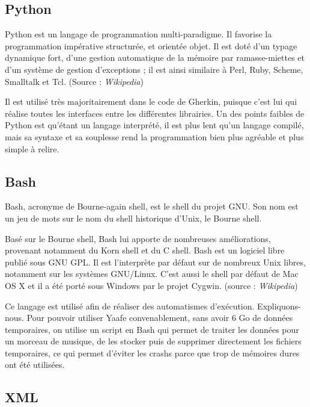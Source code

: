 \documentclass{report}
\begin{document}
\subsection{Python}

Python est un langage de programmation multi-paradigme. Il favorise la programmation impérative structurée, et orientée objet. Il est doté d'un typage dynamique fort, d'une gestion automatique de la mémoire par ramasse-miettes et d'un système de gestion d'exceptions ; il est ainsi similaire à Perl, Ruby, Scheme, Smalltalk et Tcl. (Source : \emph{Wikipedia})


Il est utilisé très majoritairement dans le code de Gherkin, puisque c'est lui qui réalise toutes les interfaces entre les différentes librairies. Un des points faibles de Python est qu'étant un langage interprété, il est plus lent qu'un langage compilé, mais sa syntaxe et sa souplesse rend la programmation bien plus agréable et plus simple à relire.


\subsection{Bash}
Bash, acronyme de Bourne-again shell, est le shell du projet GNU. Son nom est un jeu de mots sur le nom du shell historique d'Unix, le Bourne shell. 

Basé sur le Bourne shell, Bash lui apporte de nombreuses améliorations, provenant notamment du Korn shell et du C shell. Bash est un logiciel libre publié sous GNU GPL. Il est l'interprète par défaut sur de nombreux Unix libres, notamment sur les systèmes GNU/Linux. C'est aussi le shell par défaut de Mac OS X et il a été porté sous Windows par le projet Cygwin. (source : \emph{Wikipedia})

Ce langage est utilisé afin de réaliser des automatismes d'exécution. Expliquons-nous. Pour pouvoir utiliser Yaafe convenablement, sans avoir 6 Go de données temporaires, on utilise un script en Bash qui permet de traiter les données pour un morceau de musique, de les stocker puis de supprimer directement les fichiers temporaires, ce qui permet d'éviter les crashs parce que trop de mémoires dures ont été utilisées.

\subsection{XML}
\end{document}
